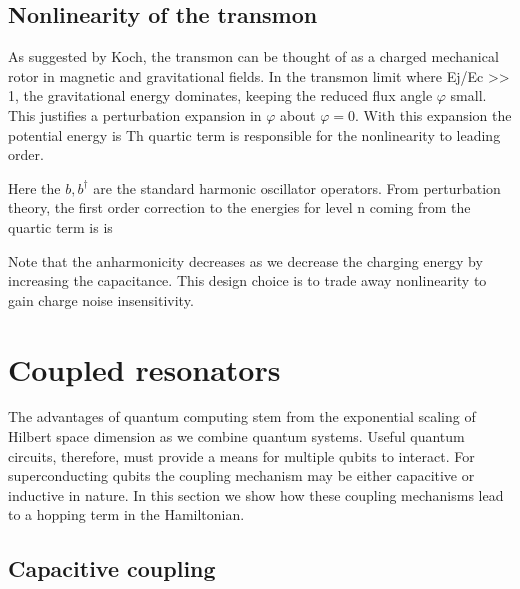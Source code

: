 \subsection{Nonlinearity of the transmon}
As suggested by Koch, the transmon can be thought of as a charged mechanical rotor in magnetic and gravitational fields.
In the transmon limit where Ej/Ec >> 1, the gravitational energy dominates, keeping the reduced flux angle $\varphi$ small.
This justifies a perturbation expansion in $\varphi$ about $\varphi=0$.
With this expansion the potential energy is
Th quartic term is responsible for the nonlinearity to leading order.


Here the $b,b^\dagger$ are the standard harmonic oscillator operators.
From perturbation theory, the first order correction to the energies for level n coming from the quartic term is is

Note that the anharmonicity decreases as we decrease the charging energy by increasing the capacitance.
This design choice is to trade away nonlinearity to gain charge noise insensitivity.

\section{Coupled resonators}
The advantages of quantum computing stem from the exponential scaling of Hilbert space dimension as we combine quantum systems.
Useful quantum circuits, therefore, must provide a means for multiple qubits to interact.
For superconducting qubits the coupling mechanism may be either capacitive or inductive in nature.
In this section we show how these coupling mechanisms lead to a hopping term in the Hamiltonian.

\subsection{Capacitive coupling}

